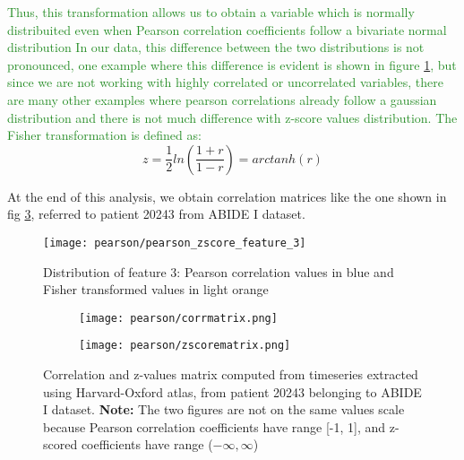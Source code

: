 \documentclass[11pt]{report}
\begin{document}
\textcolor{ForestGreen}{
Thus, this transformation allows us to obtain a variable which is normally distribuited even when Pearson correlation coefficients follow a bivariate normal distribution
In our data, this difference between the two distributions is not pronounced, one example where this difference is evident is shown in figure \ref{fig:pearson_zscore_distribution_3}, but since we are not working with highly correlated or uncorrelated variables, there are many other examples where pearson correlations already follow a gaussian distribution and there is not much difference with z-score values distribution.
The Fisher transformation is defined as:
}
\begin{equation}\label{eq:fisher_transform}
z = \frac{1}{2}ln\left(\frac{1+r}{1-r}\right) = arctanh(r)
\end{equation}

At the end of this analysis, we obtain correlation matrices like the one shown in fig \ref{fig:corrmatrices}, referred to patient 20243 from ABIDE I dataset.


\begin{figure}[h!]
\centering
\texttt{[image: pearson/pearson\_zscore\_feature\_3]}
\caption{Distribution of feature 3: Pearson correlation values in blue and Fisher transformed values in light orange}
\label{fig:pearson_zscore_distribution_3}
\end{figure}


\begin{figure}
\begin{subfigure}{0.5\textwidth}
\texttt{[image: pearson/corrmatrix.png]}
\caption{}
\label{ref:corrmatrix}
\end{subfigure}
\begin{subfigure}{0.5\textwidth}
\texttt{[image: pearson/zscorematrix.png]}
\end{subfigure}
\caption{Correlation and z-values matrix computed from timeseries extracted using Harvard-Oxford atlas, from patient 20243 belonging to ABIDE I dataset. \textbf{Note:} The two figures are not on the same values scale because Pearson correlation coefficients have range [-1, 1], and z-scored coefficients have range ($-\infty,\infty$)}
\label{fig:corrmatrices}
\end{figure}
\end{document}
